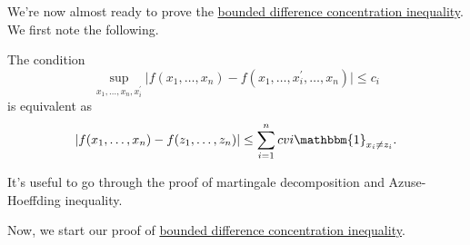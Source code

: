 We're now almost ready to prove the \hyperref[thm:bounded-difference-concentration-inequality]{bounded difference concentration inequality}. We first note the following.

\begin{note}
	The condition
	\[
		\sup _{x_1, \dots , x_n, x_i^{\prime} }\vert f(x_1, \dots , x_n) - f(x_1, \dots , x_i^{\prime} , \dots , x_n) \vert \leq c_i
	\]
	is equivalent as
	\[
		\vert f(x_1, \dots , x_n) - f(z_1, \dots , z_n) \vert \leq \sum_{i=1}^{n} cvi \mathbbm{1}_{x_i \neq z_i}.
	\]
\end{note}

\begin{remark}
	It's useful to go through the proof of martingale decomposition and Azuse-Hoeffding inequality.
\end{remark}

Now, we start our proof of \hyperref[thm:bounded-difference-concentration-inequality]{bounded difference concentration inequality}.

